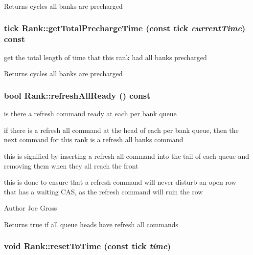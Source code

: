 \begin{DoxyReturn}{Returns}
cycles all banks are precharged 
\end{DoxyReturn}
\subsubsection[{getTotalPrechargeTime}]{\setlength{\rightskip}{0pt plus 5cm}tick Rank::getTotalPrechargeTime (const tick {\em currentTime}) const}\label{class_d_r_a_msim_i_i_1_1_rank_acedcb11333dd8281488e440ffc6a8711}


get the total length of time that this rank had all banks precharged 

\begin{DoxyReturn}{Returns}
cycles all banks are precharged 
\end{DoxyReturn}
\subsubsection[{refreshAllReady}]{\setlength{\rightskip}{0pt plus 5cm}bool Rank::refreshAllReady () const}\label{class_d_r_a_msim_i_i_1_1_rank_a4d4cff8cd255d95b088a6d70cc07570d}


is there a refresh command ready at each per bank queue 

if there is a refresh all command at the head of each per bank queue, then the next command for this rank is a refresh all banks command\par
 this is signified by inserting a refresh all command into the tail of each queue and removing them when they all reach the front\par
 this is done to ensure that a refresh command will never disturb an open row that has a waiting CAS, as the refresh command will ruin the row \begin{DoxyAuthor}{Author}
Joe Gross 
\end{DoxyAuthor}
\begin{DoxyReturn}{Returns}
true if all queue heads have refresh all commands 
\end{DoxyReturn}
\subsubsection[{resetToTime}]{\setlength{\rightskip}{0pt plus 5cm}void Rank::resetToTime (const tick {\em time})}\label{class_d_r_a_msim_i_i_1_1_rank_aa9de29dd0e1e1acc4d13f4232ab59088}


